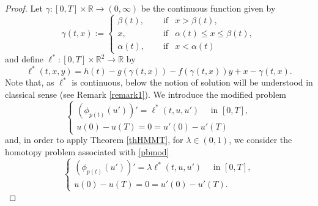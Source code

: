 \documentclass[11pt]{amsart}
\numberwithin{equation}{section} \textwidth=15.5cm
\begin{document}
\begin{proof} Let $\gamma:[0,T]\times\mathbb{R}\to(0,\infty)$ be the continuous function given by
$$\gamma(t,x):=\left \{
            \begin{array}{lll}
		      \beta(t),\quad &\mbox{ if}& x>\beta(t),\\
		      x,\quad\ &\mbox{ if}& \alpha(t)\leq x\leq\beta(t),\\
              \alpha(t),\quad &\mbox{ if}& x<\alpha(t)
			\end{array}
\right.$$
and define $\ell^{*}:[0,T]\times\mathbb{R}^2\to\mathbb{R}$ by $$\ell^*(t,x,y)=h(t)-g(\gamma(t,x))-f(\gamma(t,x))y+x-\gamma(t,x).$$ Note that, as $\ell^{*}$ is continuous, below the notion of solution will be understood in classical sense (see Remark \ref{remark1}).  We introduce the modified problem
\begin{equation}\label{pbmod}
	\left \{
            \begin{array}{ll}
		      (\phi_{p(t)}(u'))'=\ell^*(t,u,u')\quad \mbox{ in }[0,T],\\
		      u(0)-u(T)=0=u'(0)-u'(T)
			\end{array}
\right.
\end{equation}
and, in order to apply Theorem \ref{thHMMT}, for $\lambda\in(0,1)$, we consider the homotopy problem associated with \eqref{pbmod}
\begin{equation}\label{pbmodlambda}
	\left \{
            \begin{array}{ll}
		      (\phi_{p(t)}(u'))'=\lambda\ell^*(t,u,u')\quad \mbox{ in }[0,T],\\
		      u(0)-u(T)=0=u'(0)-u'(T).
			\end{array}
\right.
\end{equation}


\end{proof}
\end{document}
